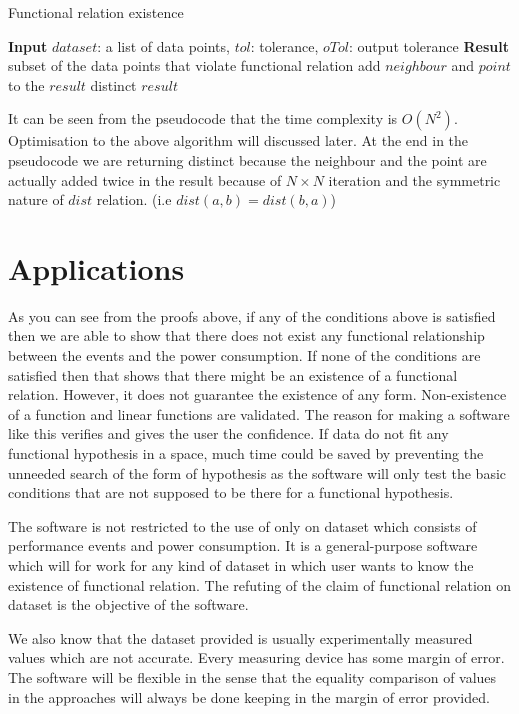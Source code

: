 \begin{algorithm}
	\caption{Functional relation existence}\label{dbscanExistence}
	\begin{algorithmic}[1]
		\State \textbf{Input} $dataset$: a list of data points, $tol$: tolerance, $oTol$: output tolerance
		\State \textbf{Result} subset of the data points that violate functional relation		
        \State add $neighbour$ and $point$ to the $result$
        \EndIf
        \EndFor
        \EndFor
        \State\Return distinct $result$
		\EndProcedure
	\end{algorithmic}
\end{algorithm}

It can be seen from the pseudocode that the time complexity is \(O(N^2)\). Optimisation to the above algorithm will discussed later. At the end in the pseudocode we are returning distinct because the neighbour and the point are actually added twice in the result because of \(N \times N\) iteration and the symmetric nature of \(dist\) relation. (i.e \(dist(a,b) = dist(b,a)\))




\section{Applications}

As you can see from the proofs above, if any of the conditions above is satisfied then we are able to show that there does not exist any functional relationship between the events and the power consumption. If none of the conditions are satisfied then that shows that there might be an existence of a functional relation. However, it does not guarantee the existence of any form. Non-existence of a function and linear functions are validated. The reason for making a software like this verifies and gives the user the confidence. If data do not fit any functional hypothesis in a space, much time could be saved by preventing the unneeded search of the form of hypothesis as the software will only test the basic conditions that are not supposed to be there for a functional hypothesis.

The software is not restricted to the use of only on dataset which consists of performance events and power consumption. It is a general-purpose software which will for work for any kind of dataset in which user wants to know the existence of functional relation. The refuting of the claim of functional relation on dataset is the objective of the software.

We also know that the dataset provided is usually experimentally measured values which are not accurate. Every measuring device has some margin of error. The software will be flexible in the sense that the equality comparison of values in the approaches will always be done keeping in the margin of error provided.
